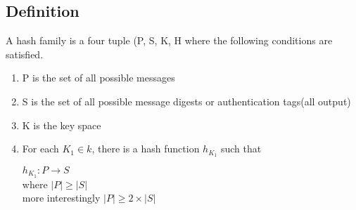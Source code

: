 \documentclass[11pt]{article}
\begin{document}
\subsection{Definition}
A hash family is a four tuple (P, S, K, H where the following conditions are satisfied.
\begin{enumerate}
    \item P is the set of all possible messages
    \item S is the set of all possible message digests or authentication tags(all output)
    \item K is the key space
    \item For each $K_1 \in k$, there is a hash function $h_{K_1}$ such that
    \begin{center}
        $h_{K_1} : P \rightarrow S$\\
        where $|P| \geq |S|$\\
        more interestingly $|P| \geq 2\times |S|$\\
    \end{center}
\end{enumerate}
\end{document}
